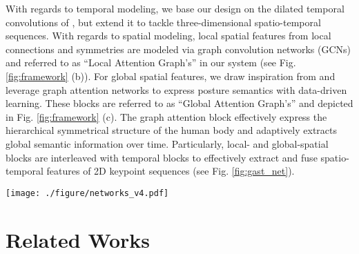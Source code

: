 \documentclass[letterpaper, 10 pt, conference, twoside]{ieeeconf}
\begin{document}
With regards to temporal modeling, we base our design on the dilated temporal convolutions of \cite{pavllo20193d}, but extend it to tackle three-dimensional spatio-temporal sequences.
With regards to spatial modeling, local spatial features from local connections and symmetries are modeled via graph convolution networks (GCNs) and referred to as ``Local Attention Graph's'' in our system (see Fig. \ref{fig:framework} (b)). 
For global spatial features, we draw inspiration from \cite{shi2019two} and leverage graph attention networks \cite{hamilton2017inductive} to express posture semantics with data-driven learning. These blocks are referred to as ``Global Attention Graph's'' and depicted in Fig. \ref{fig:framework} (c). 
The graph attention block effectively express the hierarchical symmetrical structure of the human body and adaptively extracts global semantic information over time. Particularly, local- and global-spatial blocks are interleaved with temporal blocks to effectively extract and fuse spatio-temporal features of 2D keypoint sequences (see Fig. \ref{fig:gast_net}).



\begin{figure*}[ht]
	\centering
	\texttt{[image: ./figure/networks\_v4.pdf]}
	\caption{(a) An instantiation of GAST-Net for 3D pose estimation. The GAST-Net consists of 2 Temporal Convolution Blocks and 3 Graph Attention Blocks. Given a 2D pose sequence, the output is a sample 1-frame prediction. Dimensions are enclosed in parenthesis: \emph{e.g.} (27, 17, 2) denotes a receptive field of 27 frames, 17 joints, and 2 channels. (b) The graph attention block architecture. The left dotted box indicates the local graph attention layer. The right dotted box indicates the global graph attention layer. The layer outputs is concatenated followed by a 2D convolution layer before outputting the spatio-temporal features.}
	\label{fig:gast_net}
\end{figure*}
\section{Related Works}
\end{document}
